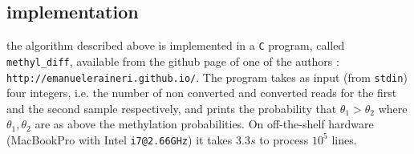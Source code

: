 \documentclass[11pt]{amsart}
\begin{document}
\subsection{implementation}
the algorithm described above is implemented in a \verb=C= program, called \verb=methyl_diff=, available from the github page of one of the authors : \verb=http://emanueleraineri.github.io/=. The program takes as input (from \verb=stdin=) four integers, i.e. the number of non converted and converted reads for the first and the second sample respectively, and prints the probability that $\theta_1>\theta_2$ where $\theta_1,\theta_2$ are as above the methylation probabilities. On off-the-shelf hardware (MacBookPro with Intel \verb=i7@2.66GHz=) it takes $3.3s$ to process $10^5$ lines.


\end{document}
